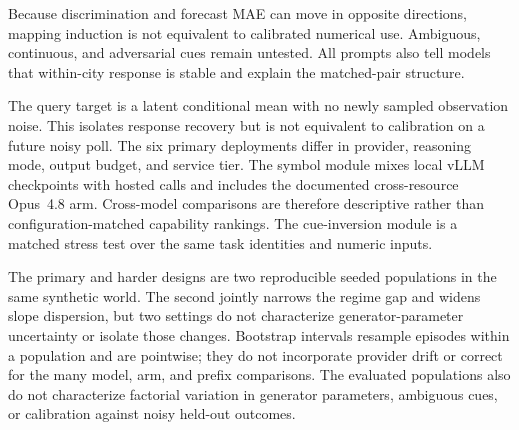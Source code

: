 Because discrimination and forecast MAE can move in opposite directions, mapping
induction is not equivalent to calibrated numerical use. Ambiguous, continuous,
and adversarial cues remain untested. All prompts also tell models that within-city
response is stable and explain the matched-pair structure.

The query target is a latent conditional mean with no newly sampled observation
noise. This isolates response recovery but is not equivalent to calibration on a
future noisy poll. The six primary deployments differ in provider, reasoning mode,
output budget, and service tier. The symbol module mixes local
vLLM checkpoints with hosted calls and includes the documented cross-resource
Opus~4.8 arm. Cross-model comparisons are therefore descriptive rather than
configuration-matched capability rankings. The cue-inversion module is a matched
stress test over the same task identities and numeric inputs.

The primary and harder designs are two reproducible seeded populations in the
same synthetic world. The second jointly narrows the regime gap and widens slope
dispersion, but two settings do not characterize generator-parameter uncertainty
or isolate those changes. Bootstrap intervals resample episodes within a
population and are pointwise; they do not incorporate provider drift or correct
for the many model, arm, and prefix comparisons. The evaluated populations also do
not characterize factorial variation in generator parameters, ambiguous cues, or
calibration against noisy held-out outcomes.

